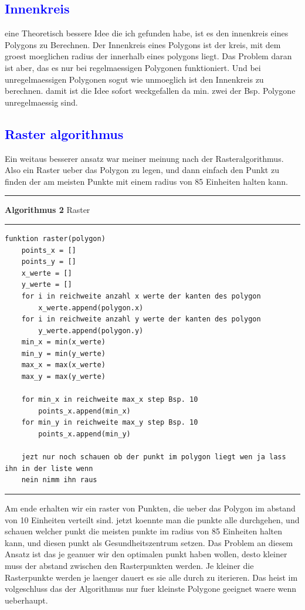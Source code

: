 \documentclass{article}
\begin{document}
\subsection{\textcolor{blue}{Innenkreis}}
eine Theoretisch bessere Idee die ich gefunden habe, ist es den innenkreis eines Polygons zu Berechnen. Der Innenkreis eines Polygons ist der kreis, mit dem groest moeglichen radius der innerhalb eines polygons liegt. Das Problem daran ist aber, das es nur bei regelmaessigen Polygonen funktioniert. Und bei unregelmaessigen Polygonen sogut wie unmoeglich ist den Innenkreis zu berechnen. damit ist die Idee sofort weckgefallen da min. zwei der Bsp. Polygone unregelmaessig sind.
\subsection{\textcolor{blue}{Raster algorithmus}}
Ein weitaus besserer ansatz war meiner meinung nach der Rasteralgorithmus. Also ein Raster ueber das Polygon zu legen, und dann einfach den Punkt zu finden der am meisten Punkte mit einem radius von 85 Einheiten halten kann.
\vspace{5pt}
\hrule
\vspace{1.5pt}
\large{\textbf{Algorithmus 2} Raster}
\vspace{1.5pt}
\hrule
\begin{verbatim}
funktion raster(polygon)
	points_x = []
	points_y = []
	x_werte = []
	y_werte = []
	for i in reichweite anzahl x werte der kanten des polygon
		x_werte.append(polygon.x)
	for i in reichweite anzahl y werte der kanten des polygon
		y_werte.append(polygon.y)
	min_x = min(x_werte)
	min_y = min(y_werte)
	max_x = max(x_werte)
	max_y = max(y_werte)
	
	for min_x in reichweite max_x step Bsp. 10
		points_x.append(min_x)
	for min_y in reichweite max_y step Bsp. 10
		points_x.append(min_y)
		
	jezt nur noch schauen ob der punkt im polygon liegt wen ja lass ihn in der liste wenn
	nein nimm ihn raus 
\end{verbatim}
\hrule
\vspace{5pt}
Am ende erhalten wir ein raster von Punkten, die ueber das Polygon im abstand von 10 Einheiten verteilt sind. jetzt koennte man die punkte alle durchgehen, und schauen welcher punkt die meisten punkte im radius von 85 Einheiten halten kann, und diesen punkt als Gesundheitszentrum setzen. Das Problem an diesem Ansatz ist das je geanuer wir den optimalen punkt haben wollen, desto kleiner muss der abstand zwischen den Rasterpunkten werden. Je kleiner die Rasterpunkte werden je laenger dauert es sie alle durch zu iterieren. Das heist im volgeschluss das der Algorithmus nur fuer kleinste Polygone geeignet waere wenn ueberhaupt.
\end{document}
